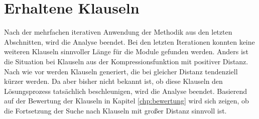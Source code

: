 \section{Erhaltene Klauseln}
\label{sec:ana:acquired}

Nach der mehrfachen iterativen Anwendung der Methodik aus den letzten Abschnitten, wird die Analyse beendet. Bei den letzten Iterationen konnten
keine weiteren Klauseln sinnvoller Länge für die Module gefunden werden. Anders ist die Situation bei Klauseln aus der Kompressionsfunktion mit
positiver Distanz. Nach wie vor werden Klauseln generiert, die bei gleicher Distanz tendenziell kürzer werden. Da aber bisher nicht bekannt ist,
ob diese Klauseln den Lösungsprozess tatsächlich beschleunigen, wird die Analyse beendet. Basierend auf der Bewertung der Klauseln in Kapitel
\ref{chp:bewertung} wird sich zeigen, ob die Fortsetzung der Suche nach Klauseln mit großer Distanz sinnvoll ist.

